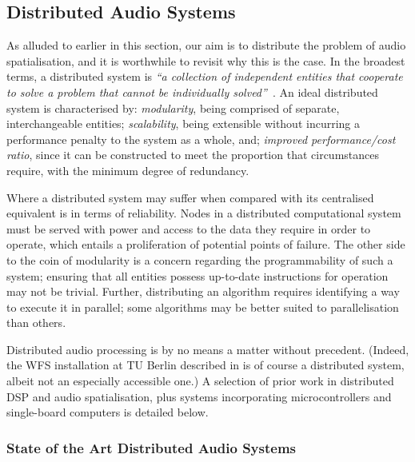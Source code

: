 \subsection{Distributed Audio Systems}\label{subsec:distributed-audio-systems}

As alluded to earlier in this section, our aim is to distribute the problem of
audio spatialisation, and it is worthwhile to revisit why this is the case.
In the broadest terms, a distributed system is \textit{``a collection of
independent entities that cooperate to solve a problem that cannot be
individually solved''}~\citep{kshemkalyani_distributed_2011}.
An ideal distributed system is characterised by: \textit{modularity}, being
comprised of separate, interchangeable entities; \textit{scalability}, being
extensible without incurring a performance penalty to the system as a whole,
and; \textit{improved performance/cost ratio}, since it can be constructed to
meet the proportion that circumstances require, with the minimum degree of
redundancy.

Where a distributed system may suffer when compared with its centralised
equivalent is in terms of reliability.
Nodes in a distributed computational system must be served with power and access
to the data they require in order to operate, which entails a proliferation of
potential points of failure.
The other side to the coin of modularity is a concern regarding the
programmability of such a system;
ensuring that all entities possess up-to-date instructions for operation may not
be trivial.
Further, distributing an algorithm requires identifying a way to execute it in
parallel;
some algorithms may be better suited to parallelisation than others.

Distributed audio processing is by no means a matter without precedent.
(Indeed, the WFS installation at TU Berlin described in
 is of course a distributed system, albeit not
an especially accessible one.)
A selection of prior work in distributed DSP and audio spatialisation, plus
systems incorporating microcontrollers and single-board computers is detailed
below.

\subsubsection{State of the Art Distributed Audio Systems}

